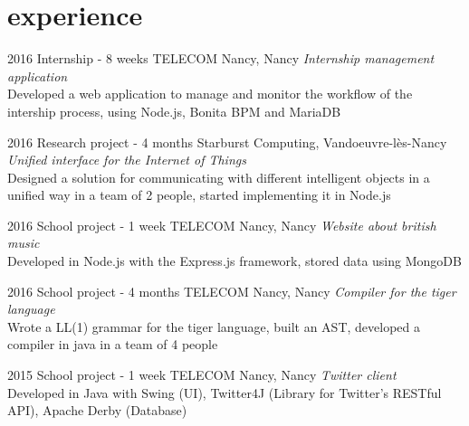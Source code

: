 \documentclass[]{lemaki-cv}
\begin{document}

	\section{experience}

	\begin{entrylist}


		\entry
		{2016}
		{Internship {\normalfont - 8 weeks}}
		{TELECOM Nancy, Nancy}
		{\emph{Internship management application} \\
		Developed a web application to manage and monitor the workflow of the
		intership process, using Node.js, Bonita BPM and MariaDB}


		\entry
		{2016}
		{Research project {\normalfont - 4 months}}
		{Starburst Computing, Vandoeuvre-lès-Nancy}
		{\emph{Unified interface for the Internet of Things} \\
		Designed a solution for communicating with different intelligent objects in
		a unified way in a team of 2 people, started implementing it in Node.js}


		\entry
		{2016}
		{School project {\normalfont - 1 week}}
		{TELECOM Nancy, Nancy}
		{\emph{Website about british music} \\
		Developed in Node.js with the Express.js framework, stored data using MongoDB}


		\entry
		{2016}
		{School project {\normalfont - 4 months}}
		{TELECOM Nancy, Nancy}
		{\emph{Compiler for the tiger language} \\
		Wrote a LL(1) grammar for the tiger language, built an AST, developed a
		compiler in java in a team of 4 people}


		\entry
		{2015}
		{School project {\normalfont - 1 week}}
		{TELECOM Nancy, Nancy}
		{\emph{Twitter client} \\
		Developed in Java with Swing (UI), Twitter4J (Library for Twitter's RESTful
		API), Apache Derby (Database)}


\end{entrylist}
\end{document}
